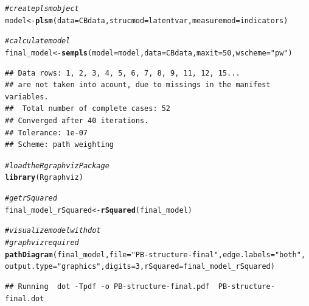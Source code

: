\documentclass{article}\usepackage[]{graphicx}\usepackage[]{color}
\makeatletter
\newcommand{\hlnum}[1]{\textcolor[rgb]{0.686,0.059,0.569}{#1}}%
\newcommand{\hlstr}[1]{\textcolor[rgb]{0.192,0.494,0.8}{#1}}%
\newcommand{\hlcom}[1]{\textcolor[rgb]{0.678,0.584,0.686}{\textit{#1}}}%
\newcommand{\hlstd}[1]{\textcolor[rgb]{0.345,0.345,0.345}{#1}}%
\newcommand{\hlkwb}[1]{\textcolor[rgb]{0.69,0.353,0.396}{#1}}%
\newcommand{\hlkwc}[1]{\textcolor[rgb]{0.333,0.667,0.333}{#1}}%
\newcommand{\hlkwd}[1]{\textcolor[rgb]{0.737,0.353,0.396}{\textbf{#1}}}%
\newenvironment{kframe}{%
 \def\at@end@of@kframe{}%
 \ifinner\ifhmode%
  \def\at@end@of@kframe{\end{minipage}}%
  \begin{minipage}{\columnwidth}%
 \fi\fi%
 \def\FrameCommand##1{\hskip\@totalleftmargin \hskip-\fboxsep
 \colorbox{shadecolor}{##1}\hskip-\fboxsep
     \hskip-\linewidth \hskip-\@totalleftmargin \hskip\columnwidth}%
 \MakeFramed {\advance\hsize-\width
   \@totalleftmargin\z@ \linewidth\hsize
   \@setminipage}}%
 {\par\unskip\endMakeFramed%
 \at@end@of@kframe}
\newenvironment{knitrout}{}{} %
\makeatother
\begin{document}
\begin{knitrout}
\begin{kframe}
\begin{alltt}
\hlcom{#create plsm object}
\hlstd{model} \hlkwb{<-} \hlkwd{plsm}\hlstd{(}\hlkwc{data} \hlstd{= CBdata,} \hlkwc{strucmod}\hlstd{=latentvar,} \hlkwc{measuremod}\hlstd{=indicators)}

\hlcom{#calculate model}
\hlstd{final_model} \hlkwb{<-} \hlkwd{sempls}\hlstd{(}\hlkwc{model} \hlstd{= model,}\hlkwc{data} \hlstd{= CBdata,}\hlkwc{maxit}\hlstd{=}\hlnum{50}\hlstd{,}\hlkwc{wscheme}\hlstd{=}\hlstr{"pw"}\hlstd{)}
\end{alltt}
\begin{verbatim}
## Data rows: 1, 2, 3, 4, 5, 6, 7, 8, 9, 11, 12, 15...
## are not taken into acount, due to missings in the manifest variables.
##  Total number of complete cases: 52 
## Converged after 40 iterations.
## Tolerance: 1e-07
## Scheme: path weighting
\end{verbatim}
\begin{alltt}
\hlcom{#load the Rgraphviz Package}
\hlkwd{library}\hlstd{(Rgraphviz)}

\hlcom{#get rSquared}
\hlstd{final_model_rSquared} \hlkwb{<-} \hlkwd{rSquared}\hlstd{(final_model)}

\hlcom{#visualize model with dot }
\hlcom{#graphviz required}
\hlkwd{pathDiagram}\hlstd{(final_model,} \hlkwc{file} \hlstd{=} \hlstr{"PB-structure-final"}\hlstd{,} \hlkwc{edge.labels} \hlstd{=} \hlstr{"both"}\hlstd{,}
            \hlkwc{output.type} \hlstd{=} \hlstr{"graphics"}\hlstd{,} \hlkwc{digits} \hlstd{=} \hlnum{3}\hlstd{,} \hlkwc{rSquared}\hlstd{=final_model_rSquared)}
\end{alltt}
\begin{verbatim}
## Running  dot -Tpdf -o PB-structure-final.pdf  PB-structure-final.dot
\end{verbatim}
\end{kframe}
\end{knitrout}

\clearpage
\end{document}
